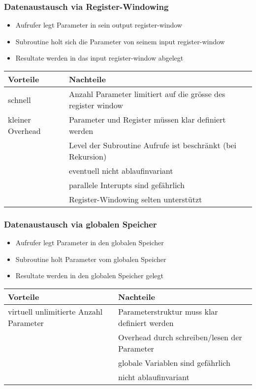 \subsubsection{Datenaustausch via Register-Windowing}
\begin{itemize}
  \item Aufrufer legt Parameter in sein output register-window
  \item Subroutine holt sich die Parameter von seinem input register-window
  \item Resultate werden in das input register-window abgelegt
\end{itemize}
\begin{tabular}{p{}|l}
	\textbf{Vorteile} 	& \textbf{Nachteile} \\
	\hline
	schnell				& Anzahl Parameter limitiert auf die grösse des register window \\
	kleiner Overhead	& Parameter und Register müssen klar definiert werden \\
						& Level der Subroutine Aufrufe ist beschränkt (bei Rekursion) \\
						& eventuell nicht ablaufinvariant \\ 
						& parallele Interupts sind gefährlich \\
						& Register-Windowing selten unterstützt
\end{tabular}


\subsubsection{Datenaustausch via globalen Speicher}
\begin{itemize}
  \item Aufrufer legt Parameter in den globalen Speicher
  \item Subroutine holt Parameter vom globalen Speicher
  \item Resultate werden in den globalen Speicher gelegt
\end{itemize}
\begin{tabular}{p{}|l}
	\textbf{Vorteile} 	& \textbf{Nachteile} \\
	\hline
	virtuell unlimitierte Anzahl Parameter	& Parameterstruktur muss klar definiert werden \\
											& Overhead durch schreiben/lesen der Parameter \\
											& globale Variablen sind gefährlich \\
											& nicht ablaufinvariant
\end{tabular}


